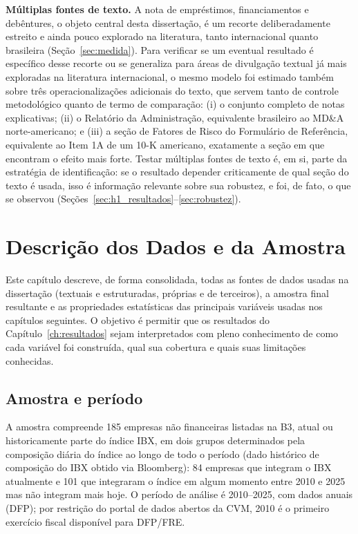 \documentclass[a4paper,12pt]{report}
\begin{document}
\textbf{Múltiplas fontes de texto.} A nota de empréstimos, financiamentos e debêntures, o objeto central desta dissertação, é um recorte deliberadamente estreito e ainda pouco explorado na literatura, tanto internacional quanto brasileira (Seção~\ref{sec:medida}). Para verificar se um eventual resultado é específico desse recorte ou se generaliza para áreas de divulgação textual já mais exploradas na literatura internacional, o mesmo modelo foi estimado também sobre três operacionalizações adicionais do texto, que servem tanto de controle metodológico quanto de termo de comparação: (i) o conjunto completo de notas explicativas; (ii) o Relatório da Administração, equivalente brasileiro ao MD\&A norte-americano; e (iii) a seção de Fatores de Risco do Formulário de Referência, equivalente ao Item 1A de um 10-K americano, exatamente a seção em que  encontram o efeito mais forte. Testar múltiplas fontes de texto é, em si, parte da estratégia de identificação: se o resultado depender criticamente de qual seção do texto é usada, isso é informação relevante sobre sua robustez, e foi, de fato, o que se observou (Seções~\ref{sec:h1_resultados}--\ref{sec:robustez}).

\chapter{Descrição dos Dados e da Amostra}
\label{ch:dados}

Este capítulo descreve, de forma consolidada, todas as fontes de dados usadas na dissertação (textuais e estruturadas, próprias e de terceiros), a amostra final resultante e as propriedades estatísticas das principais variáveis usadas nos capítulos seguintes. O objetivo é permitir que os resultados do Capítulo~\ref{ch:resultados} sejam interpretados com pleno conhecimento de como cada variável foi construída, qual sua cobertura e quais suas limitações conhecidas.

\section{Amostra e período}
\label{sec:amostra}

A amostra compreende 185 empresas não financeiras listadas na B3, atual ou historicamente parte do índice IBX, em dois grupos determinados pela composição diária do índice ao longo de todo o período (dado histórico de composição do IBX obtido via Bloomberg): 84 empresas que integram o IBX atualmente e 101 que integraram o índice em algum momento entre 2010 e 2025 mas não integram mais hoje. O período de análise é 2010--2025, com dados anuais (DFP); por restrição do portal de dados abertos da CVM, 2010 é o primeiro exercício fiscal disponível para DFP/FRE.
\end{document}
